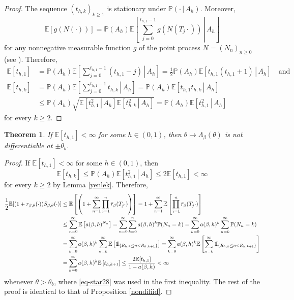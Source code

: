 \documentclass[a4paper]{amsart}
\numberwithin{equation}{section}
\theoremstyle{plain}
\newtheorem{theorem}{\sc Theorem}[section]
\theoremstyle{remark}
\begin{document}
\begin{proof}
	The sequence $(t_{h,k})_{k\ge1}$ is stationary under $\mathbb{P}(\cdot\,|\,A_h)$. Moreover,
	$$\mathbb{E}[g(N(\cdot))] = \mathbb{P}(A_h)\mathbb{E}\left[\left.\sum_{j=0}^{t_{h,1}-1}g(N(T_j\cdot))\,\right|\,A_h\right]$$
	for any nonnegative measurable function $g$ of the point process $N = (N_n)_{n\ge0}$ (see \cite[Theorem 13.3.I]{DalVer2008}). Therefore,
	\begin{align*}
	\mathbb{E}[t_{h,1}] &= \mathbb{P}(A_h)\mathbb{E}\left[\left.\sum_{j=0}^{t_{h,1}-1}(t_{h,1} - j)\,\right|\,A_h\right] = \frac1{2}\mathbb{P}(A_h)\mathbb{E}\left[\left.t_{h,1}(t_{h,1} + 1)\,\right|\,A_h\right]\quad\text{and}\\ 
	\mathbb{E}[t_{h,k}] &= \mathbb{P}(A_h)\mathbb{E}\left[\left.\sum_{j=0}^{t_{h,1}-1}t_{h,k}\,\right|\,A_h\right] = \mathbb{P}(A_h)\mathbb{E}\left[\left.t_{h,1}t_{h,k}\,\right|\,A_h\right]\\
	&\le \mathbb{P}(A_h)\sqrt{\mathbb{E}\left[\left.t_{h,1}^2\,\right|\,A_h\right]\mathbb{E}\left[\left.t_{h,k}^2\,\right|\,A_h\right]} = \mathbb{P}(A_h)\mathbb{E}\left[\left.t_{h,1}^2\,\right|\,A_h\right]
	\end{align*}
	for every $k\ge2$.
\end{proof}

\begin{theorem}\label{nondifgen}
	If $\mathbb{E}[t_{h,1}]<\infty$ for some $h\in(0,1)$, then $\theta\mapsto\Lambda_\beta(\theta)$ is not differentiable at $\pm\theta_b$.
\end{theorem}

\begin{proof}
	If $\mathbb{E}[t_{h,1}]<\infty$ for some $h\in(0,1)$, then $$\mathbb{E}[t_{h,k}] \le \mathbb{P}(A_h)\mathbb{E}\left[\left.t_{h,1}^2\,\right|\,A_h\right] \le 2\mathbb{E}[t_{h,1}]<\infty$$ for every $k\ge2$ by Lemma \ref{yenlek}. Therefore,
	\begin{align*}
	\frac1{2}\mathbb{E}[(1 + r_{\beta,\theta}(\cdot))S_{\beta,\theta}(\cdot)] &\le \mathbb{E}\left[\left(1 + \sum_{n=1}^\infty\prod_{j=1}^n\bar r_\beta(T_j\cdot)\right)\right] = 1 + \sum_{n=1}^\infty\mathbb{E}\left[\prod_{j=1}^n\bar r_\beta(T_j\cdot)\right]\\
	&\le \sum_{n=0}^\infty\mathbb{E}\left[a(\beta,h)^{N_n}\right] = \sum_{n=0}^\infty\sum_{k=0}^n a(\beta,h)^k\mathbb{P}(N_n = k) = \sum_{k=0}^\infty a(\beta,h)^k \sum_{n=k}^\infty \mathbb{P}(N_n = k)\\
	&= \sum_{k=0}^\infty a(\beta,h)^k \sum_{n=k}^\infty \mathbb{E}\left[{{{\rm 1\mkern-1.5mu}\!{\rm I}}}_{\{R_{h,k}\le n < R_{h,k+1}\}}\right] = \sum_{k=0}^\infty a(\beta,h)^k \mathbb{E}\left[\sum_{n=k}^\infty{{{\rm 1\mkern-1.5mu}\!{\rm I}}}_{\{R_{h,k}\le n < R_{h,k+1}\}}\right]\\
	&= \sum_{k=0}^\infty a(\beta,h)^k \mathbb{E}\left[t_{h,k+1}\right] \le \frac{2\mathbb{E}[t_{h,1}]}{1-a(\beta,h)} < \infty
	\end{align*}
	whenever $\theta>\theta_b$, {}{where \eqref{eq-star28} was
      used in the first inequality}. The rest of the proof is identical to that of Proposition \ref{nondifiid}.
\end{proof}
\end{document}
